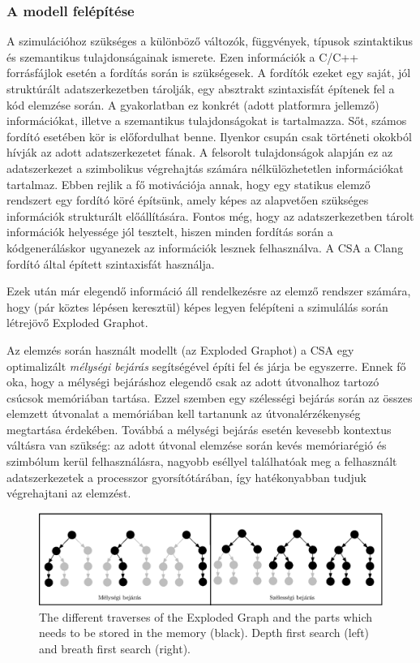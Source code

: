 \documentclass[oneside, a4paper, 12pt]{article}
\theoremstyle{definition}
\begin{document}
\subsubsection{A modell felépítése}
A szimulációhoz szükséges a különböző változók, függvények, típusok 
szintaktikus és szemantikus tulajdonságainak ismerete.
Ezen információk a C/C++ forrásfájlok esetén a fordítás során is szükségesek.
A fordítók ezeket egy saját, jól struktúrált adatszerkezetben tárolják, egy 
absztrakt szintaxisfát építenek fel a kód elemzése során.
A gyakorlatban ez konkrét (adott platformra jellemző) információkat, illetve a 
szemantikus tulajdonságokat is tartalmazza.
Sőt, számos fordító esetében kör is előfordulhat benne. Ilyenkor csupán csak 
történeti okokból hívják az adott adatszerkezetet fának.
A felsorolt tulajdonságok alapján ez az adatszerkezet a szimbolikus végrehajtás 
számára nélkülözhetetlen információkat tartalmaz. 
Ebben rejlik a fő motivációja annak, hogy egy statikus elemző rendszert egy 
fordító köré építsünk,
amely képes az alapvetően szükséges információk strukturált előállítására. 
Fontos még, hogy az adatszerkezetben
tárolt információk helyessége jól tesztelt, hiszen minden fordítás során a 
kódgeneráláskor ugyanezek az
információk lesznek felhasználva. A CSA a Clang fordító által épített 
szintaxisfát használja.

Ezek után már elegendő információ áll rendelkezésre az elemző rendszer számára,
hogy (pár köztes lépésen keresztül) képes legyen felépíteni a szimulálás során 
létrejövő Exploded Graphot.

Az elemzés során használt modellt (az Exploded Graphot) a CSA egy
optimalizált \textit{mélységi bejárás} segítségével építi fel és járja be 
egyszerre.
Ennek fő oka, hogy a mélységi bejáráshoz elegendő csak az adott útvonalhoz
tartozó csúcsok memóriában tartása. Ezzel szemben egy szélességi bejárás során
az összes elemzett útvonalat a memóriában kell tartanunk az útvonalérzékenység
megtartása érdekében. Továbbá a mélységi bejárás esetén kevesebb kontextus 
váltásra van
szükség: az adott útvonal elemzése során kevés memóriarégió és szimbólum kerül
felhasználásra, nagyobb eséllyel találhatóak meg a felhasznált adatszerkezetek a
processzor gyorsítótárában, így hatékonyabban tudjuk végrehajtani az 
elemzést.

\begin{figure}[h]
	\centering
	\includegraphics[width=1\textwidth]{img/memoria.eps}
	\caption{The different traverses of the Exploded Graph and the parts which 
	needs to be stored in the memory (black). Depth first search (left) and 
	breath first search (right).}
	\label{fig:bejaras_szemleltetes}
\end{figure}
\end{document}
